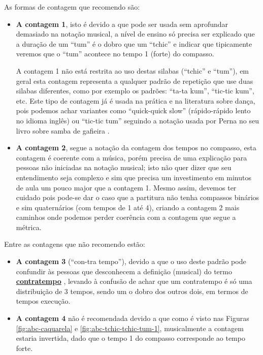 As formas de contagem que recomendo são:
\begin{itemize}
\item \textbf{A contagem 1}, 
isto é devido a que pode ser usada sem aprofundar demasiado 
na notação musical, a nível de ensino só precisa ser explicado que a duração de um 
``tum'' é o dobro que um ``tchic'' e indicar que tipicamente veremos que o ``tum''
acontece no tempo 1 (forte) do compasso.

A contagem 1 não está restrita ao uso destas silabas (``tchic'' e ``tum''), 
em geral esta contagem representa a qualquer padrão de repetição
que use duas silabas diferentes, como por exemplo os padrões: ``ta-ta kum'', ``tic-tic kum'', etc. 
Este tipo de contagem já é usada na prática e na literatura sobre dança, pois 
podemos achar variantes como ``quick-quick slow'' (rápido-rápido lento no idioma inglês) \cite[pp. 7]{wright1945dance}
ou ``tic-tic tum'' seguindo a notação usada por Perna no seu livro sobre samba de gafieira 
\cite[pp. 146]{perna2002samba} \cite[pp. 197, 211]{maia2014danca}.
\item \textbf{A contagem 2}, segue a notação da contagem dos tempos no compasso, esta
contagem é coerente com a música, porém precisa de uma explicação  
para pessoas não iniciadas na notação musical; isto não quer dizer que seu
entendimento seja complexo e sim que precisa um investimento em minutos de aula
um pouco major que a contagem 1.
Mesmo assim, devemos ter cuidado pois pode-se dar o caso que a partitura não tenha compassos binários 
e sim quaternários (com tempos de 1 até 4), 
criando a contagem 2 mais caminhos onde podemos perder coerência com a contagem que segue a métrica.
\end{itemize}


Entre as contagens que não recomendo estão:
\begin{itemize}
\item \textbf{A contagem 3} (``con-tra tempo''), 
devido a que o uso deste padrão pode confundir às pessoas que desconhecem 
a definição (musical) do termo \hyperref[sec:contratempo]{\textbf{contratempo}} 
\cite[pp. 16]{mascarenhascurso} \cite[pp. 36]{azevedocompor}, 
levando à confusão de achar que um contratempo é só uma distribuição de 3 tempos, 
sendo um o dobro dos outros dois, em termos de tempos execução.
\item \textbf{A contagem 4} não é recomendada devido a que como é visto nas Figuras 
\ref{fig:abc-caquarela} e \ref{fig:abc-tchic-tchic-tum-1}, musicalmente a contagem estaria invertida,
dado que o tempo 1 do compasso corresponde ao tempo forte.
\end{itemize}~

